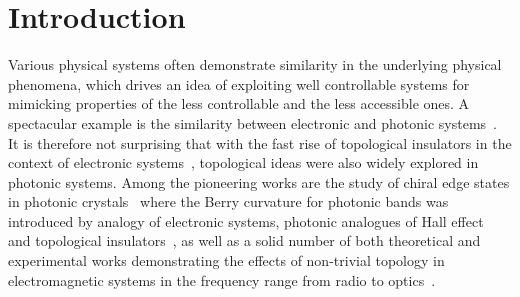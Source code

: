 \documentclass[
aps,
prl,
groupedaddress,
superscriptaddress,
floatfix,
notitlepage
]{revtex4-1}
\begin{document}

{\let\newpage\relax\maketitle}

\section*{Introduction}

Various physical systems often demonstrate similarity in the underlying physical phenomena, which drives an idea of exploiting well controllable systems for mimicking properties of the less controllable and the less accessible ones.
A spectacular example is the similarity between electronic and photonic systems~\cite{Georgescu2014}. 
It is therefore not surprising that with the fast rise of topological insulators in the context of electronic systems~\cite{Kane-Mele,Bernevig,Konig}, topological ideas were 
also widely explored in photonic systems. Among the pioneering works are the  
study of chiral edge states in photonic crystals~\cite{Raghu-2008} where the Berry curvature for photonic bands was introduced by analogy of electronic systems, photonic analogues of Hall effect~\cite{Haldane2008a, Wang2008,Wang-2009} and topological insulators~\cite{Hafezi-2011,Fang-2012,Rechtsman-2013,Khanikaev2013}, as well as a solid number of both theoretical and experimental works demonstrating the effects of non-trivial topology in electromagnetic systems in the frequency range from radio to optics~\cite{Lu-2014}. 
\end{document}
